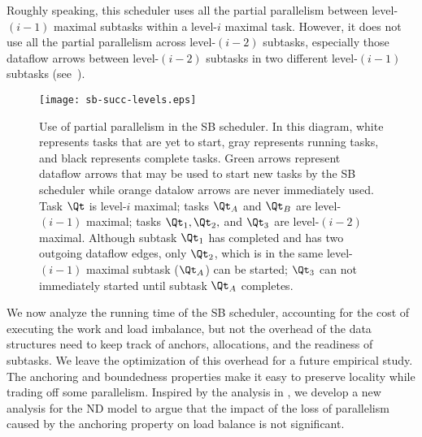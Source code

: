 Roughly speaking, this scheduler uses all the partial parallelism
between level-$(i-1)$ maximal subtasks within a level-$i$ maximal
task. However, it does not use all the partial parallelism across
level-$(i-2)$ subtasks, especially those dataflow arrows between
level-$(i-2)$ subtasks in two different level-$(i-1)$ subtasks
(see~).

\begin{figure}[!th]
\texttt{[image: sb-succ-levels.eps]}
\vspace{1ex}
\caption{Use of partial parallelism in the SB scheduler.  In this
  diagram, white represents tasks that are yet to start, gray
  represents running tasks, and black represents complete tasks.
  Green arrows represent dataflow arrows that may be used to start new
  tasks by the SB scheduler while orange datalow arrows are never
  immediately used.  Task $\Qt$ is level-$i$ maximal; tasks $\Qt_A$
  and $\Qt_B$ are level-$(i-1)$ maximal; tasks $\Qt_1,\Qt_2,$ and
  $\Qt_3$ are level-$(i-2)$ maximal.  Although subtask $\Qt_1$ has
  completed and has two outgoing dataflow edges, only $\Qt_2$, which
  is in the same level-$(i-1)$ maximal subtask ($\Qt_A$) can be
  started; $\Qt_3$ can not immediately started until subtask $\Qt_A$
  completes.
\label{fig:succ-levels}}
\end{figure}




 We now analyze the running time of the SB scheduler,
accounting for the cost of executing the work and load imbalance, but
not the overhead of the data structures need to keep track of anchors,
allocations, and the readiness of subtasks. We leave the optimization
of this overhead for a future empirical study.  The anchoring and
boundedness properties make it easy to preserve locality while trading
off some parallelism. Inspired by the analysis in
\cite{BlellochFiGi11,Simhadri13}, we develop a new analysis for the
ND model to argue that the impact of the loss of parallelism caused by
the anchoring property on load balance is not significant.

